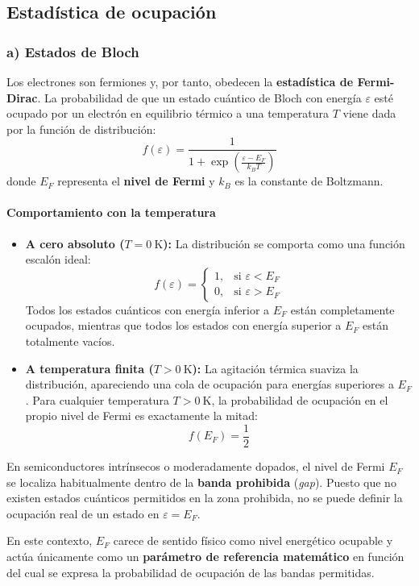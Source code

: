 \subsection{Estadística de ocupación}
\subsubsection{a) Estados de Bloch}

Los electrones son fermiones y, por tanto, obedecen la \textbf{estadística de Fermi-Dirac}. La probabilidad de que un estado cuántico de Bloch con energía $\varepsilon$ esté ocupado por un electrón en equilibrio térmico a una temperatura $T$ viene dada por la función de distribución:
\[
f(\varepsilon) = \frac{1}{1 + \exp\left(\frac{\varepsilon - E_F}{k_B T}\right)}
\]
donde $E_F$ representa el \textbf{nivel de Fermi} y $k_B$ es la constante de Boltzmann.

\paragraph{Comportamiento con la temperatura}
\begin{itemize}
    \item \textbf{A cero absoluto ($T = \SI{0}{\kelvin}$):} La distribución se comporta como una función escalón ideal:
    \[
    f(\varepsilon) = \begin{cases} 
    1, & \text{si } \varepsilon < E_F \\ 
    0, & \text{si } \varepsilon > E_F 
    \end{cases}
    \]
    Todos los estados cuánticos con energía inferior a $E_F$ están completamente ocupados, mientras que todos los estados con energía superior a $E_F$ están totalmente vacíos.
    
    \item \textbf{A temperatura finita ($T > \SI{0}{\kelvin}$):} La agitación térmica suaviza la distribución, apareciendo una cola de ocupación para energías superiores a $E_F$. Para cualquier temperatura $T > \SI{0}{\kelvin}$, la probabilidad de ocupación en el propio nivel de Fermi es exactamente la mitad:
    \[
    f(E_F) = \frac{1}{2}
    \]
\end{itemize}

\begin{concepto}
En semiconductores intrínsecos o moderadamente dopados, el nivel de Fermi $E_F$ se localiza habitualmente dentro de la \textbf{banda prohibida} (\textit{gap}). Puesto que no existen estados cuánticos permitidos en la zona prohibida, no se puede definir la ocupación real de un estado en $\varepsilon = E_F$. 

En este contexto, $E_F$ carece de sentido físico como nivel energético ocupable y actúa únicamente como un \textbf{parámetro de referencia matemático} en función del cual se expresa la probabilidad de ocupación de las bandas permitidas.
\end{concepto}

